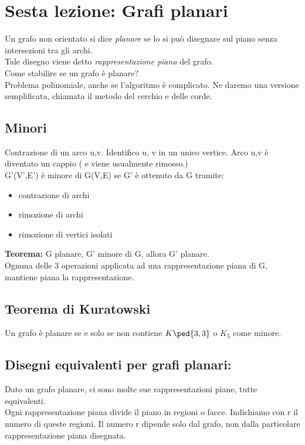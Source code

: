 \section{Sesta lezione: Grafi planari}
Un grafo non orientato si dice \emph{planare} se lo si può disegnare sul piano senza intersezioni tra gli archi. \\
Tale disegno viene detto \emph{rappresentazione piana} del grafo.\\

\noindent
Come stabilire se un grafo è planare? \\
Problema polinomiale, anche se l'algoritmo è complicato. Ne daremo una versione semplificata, chiamata il metodo del cerchio e delle corde.\\

\subsection{Minori}
Contrazione di un arco u,v. Identifico u, v in un unico vertice. Arco u,v è diventato
un cappio ( e viene usualmente rimosso.) \\
G'(V',E') è minore di G(V,E) se G' è ottenuto da G tramite:
\begin{itemize}
\item contrazione di archi
\item rimozione di archi
\item rimozione di vertici isolati
\end{itemize}
\textbf{Teorema:} G planare, G' minore di G, allora G' planare. \\
Ognuna delle 3 operazioni applicata ad una rappresentazione piana di G, mantiene piana la rappresentazione.

\subsection{Teorema di Kuratowski}
Un grafo è planare se e solo se non contiene $K\ped{3,3}$ o $K_5$ come minore.\\

\noindent
\subsection{Disegni equivalenti per grafi planari:} Dato un grafo planare, ci sono molte sue rappresentazioni piane, tutte equivalenti. \\
Ogni rappresentazione piana divide il piano in regioni o facce. Indichiamo con r il numero di queste
regioni. Il numero r dipende solo dal grafo, non dalla particolare rappresentazione piana disegnata. 


